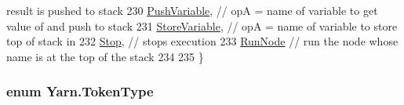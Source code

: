 \begin{DoxyCode}
{       result is pushed to stack}
230         \hyperlink{a00026_ad5dfb6ee68ca7469623ad3e459f98894ab8c46f65015a178516fadbb5ad6c2038}{PushVariable},               \textcolor{comment}{// opA = name of variable to get value of and push to stack}
231         \hyperlink{a00026_ad5dfb6ee68ca7469623ad3e459f98894a872dc050abaff4beb46e70dadd4088c2}{StoreVariable},             \textcolor{comment}{// opA = name of variable to store top of stack in}
232         \hyperlink{a00026_ad5dfb6ee68ca7469623ad3e459f98894a11a755d598c0c417f9a36758c3da7481}{Stop},               \textcolor{comment}{// stops execution}
233         \hyperlink{a00026_ad5dfb6ee68ca7469623ad3e459f98894ae956bcf888278c168ee9b106927ff6ac}{RunNode}              \textcolor{comment}{// run the node whose name is at the top of the stack}
234 
235     \}
\end{DoxyCode}
\hypertarget{a00026_a301aa7c866593a5b625a8fc158bbeace}{
\subsubsection[{Token\-Type}]{\setlength{\rightskip}{0pt plus 5cm}enum {\bf Yarn.\-Token\-Type}\hspace{0.3cm}{\ttfamily [package]}}}\label{a00026_a301aa7c866593a5b625a8fc158bbeace}
